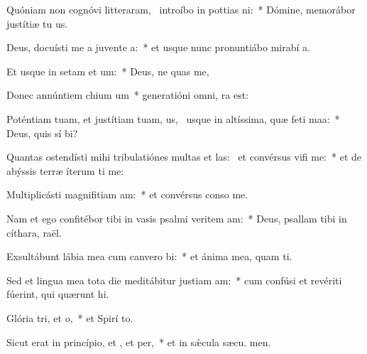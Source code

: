 \item Quóniam non cognóvi litteraram,~\pscross{} introíbo in pottias ni:~* Dómine, memorábor justítiæ tu us.
\item Deus, docuísti me a juvente a:~* et usque nunc pronuntiábo mirabí a.
\item Et usque in setam et um:~* Deus, ne quas me,
\item Donec annúntiem chium um~* generatióni omni,  ra est:
\item Poténtiam tuam, et justítiam tuam, us,~\pscross{} usque in altíssima, quæ feti maa:~* Deus, quis sí bi?
\item Quantas ostendísti mihi tribulatiónes multas et las:~\pscross{} et convérsus vifi me:~* et de abýssis terræ íterum ti me:
\item Multiplicásti magnifitiam am:~* et convérsus conso  me.
\item Nam et ego confitébor tibi in vasis psalmi veritem am:~* Deus, psallam tibi in cíthara,  raël.
\item Exsultábunt lábia mea cum canvero bi:~* et ánima mea, quam ti.
\item Sed et lingua mea tota die meditábitur justiam am:~* cum confúsi et revériti fúerint, qui quærunt  hi.
\item Glória tri, et o,~* et Spirí to.
\item Sicut erat in princípio, et , et per,~* et in sǽcula sæcu. men.
